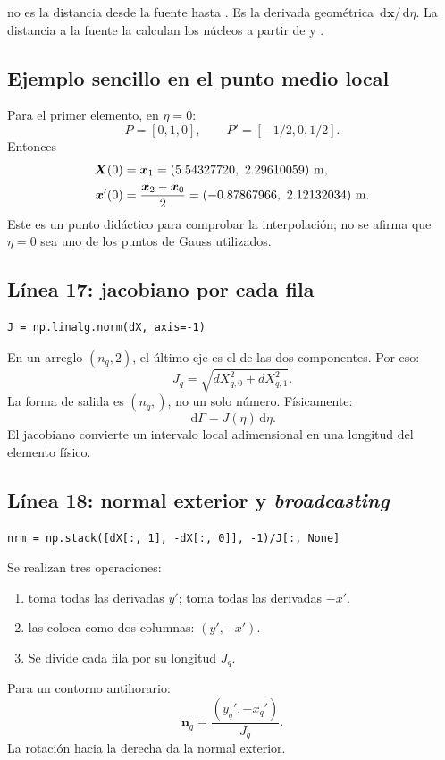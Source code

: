 \documentclass[11pt,a4paper]{article}
\numberwithin{equation}{section}
\newcommand{\vect}[1]{\bm{#1}}
\newcommand{\dd}{\,\mathrm{d}}
\DeclareRobustCommand{\code}[1]{\texttt{\detokenize{#1}}}
\begin{document}
\begin{cuidado}
\code{dX} no es la distancia desde la fuente hasta \code{X}.
Es la derivada geom\'etrica $\dd\vect x/\dd\eta$.
La distancia a la fuente la calculan los n\'ucleos a partir de
\code{X} y \code{xi}.
\end{cuidado}

\subsection{Ejemplo sencillo en el punto medio local}
Para el primer elemento, en $\eta=0$:
\begin{equation}
 P=[0,1,0],\qquad P'=[-1/2,0,1/2].
\end{equation}
Entonces
\begin{align}
 \vect X(0)&=\vect x_1=(5.54327720,\ 2.29610059)\ {\rm m},\\
 \vect x'(0)&=\frac{\vect x_2-\vect x_0}{2}
       =(-0.87867966,\ 2.12132034)\ {\rm m}.
\end{align}
Este es un punto did\'actico para comprobar la interpolaci\'on;
no se afirma que $\eta=0$ sea uno de los puntos de Gauss utilizados.

\subsection{L\'inea 17: jacobiano por cada fila}
\begin{lstlisting}
J = np.linalg.norm(dX, axis=-1)
\end{lstlisting}
En un arreglo $(n_q,2)$, el \'ultimo eje es el de las dos componentes.
Por eso:
\begin{equation}
 J_q=\sqrt{dX_{q,0}^2+dX_{q,1}^2}.
\end{equation}
La forma de salida es $(n_q,)$, no un solo n\'umero.
F\'isicamente:
\begin{equation}
 \dd\Gamma=J(\eta)\dd\eta.
\end{equation}
El jacobiano convierte un intervalo local adimensional en una longitud
del elemento f\'isico.

\subsection{L\'inea 18: normal exterior y \textit{broadcasting}}
\begin{lstlisting}
nrm = np.stack([dX[:, 1], -dX[:, 0]], -1)/J[:, None]
\end{lstlisting}
Se realizan tres operaciones:
\begin{enumerate}
 \item \code{dX[:,1]} toma todas las derivadas $y'$;
 \code{-dX[:,0]} toma todas las derivadas $-x'$.
 \item \code{np.stack(...,-1)} las coloca como dos columnas:
 $(y',-x')$.
 \item Se divide cada fila por su longitud $J_q$.
\end{enumerate}
Para un contorno antihorario:
\begin{equation}
 \vect n_q=\frac{(y_q',-x_q')}{J_q}.
\end{equation}
La rotaci\'on hacia la derecha da la normal exterior.
\end{document}
